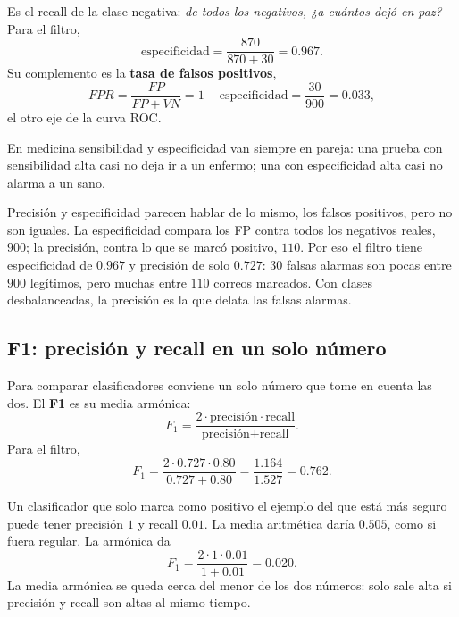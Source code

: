 \documentclass[11pt,letterpaper]{article}
\begin{document}
Es el recall de la clase negativa: \textit{de todos los negativos, ¿a
cuántos dejó en paz?} Para el filtro,
\[
    \text{especificidad} = \frac{870}{870 + 30} = 0.967 .
\]
Su complemento es la \textbf{tasa de falsos positivos},
\[
    FPR = \frac{FP}{FP + VN} = 1 - \text{especificidad}
        = \frac{30}{900} = 0.033 ,
\]
el otro eje de la curva ROC.

En medicina sensibilidad y especificidad van siempre en pareja: una
prueba con sensibilidad alta casi no deja ir a un enfermo; una con
especificidad alta casi no alarma a un sano.

\begin{ojo}
    Precisión y especificidad parecen hablar de lo mismo, los falsos
    positivos, pero no son iguales. La especificidad compara los FP
    contra todos los negativos reales, $900$; la precisión, contra lo
    que se marcó positivo, $110$. Por eso el filtro tiene
    especificidad de $0.967$ y precisión de solo $0.727$: $30$ falsas
    alarmas son pocas entre $900$ legítimos, pero muchas entre $110$
    correos marcados. Con clases desbalanceadas, la precisión es la
    que delata las falsas alarmas.
\end{ojo}


\subsection*{F1: precisión y recall en un solo número}

Para comparar clasificadores conviene un solo número que tome en
cuenta las dos. El \textbf{F1} es su media armónica:
\[
    F_1 = \frac{2 \cdot \text{precisión} \cdot \text{recall}}
               {\text{precisión} + \text{recall}} .
\]
Para el filtro,
\[
    F_1 = \frac{2 \cdot 0.727 \cdot 0.80}{0.727 + 0.80}
        = \frac{1.164}{1.527} = 0.762 .
\]

\begin{ejemplo}
    Un clasificador que solo marca como positivo el ejemplo del que
    está más seguro puede tener precisión $1$ y recall $0.01$. La media
    aritmética daría $0.505$, como si fuera regular. La armónica da
    \[
        F_1 = \frac{2 \cdot 1 \cdot 0.01}{1 + 0.01} = 0.020 .
    \]
    La media armónica se queda cerca del menor de los dos números: solo
    sale alta si precisión y recall son altas al mismo tiempo.
\end{ejemplo}
\end{document}
